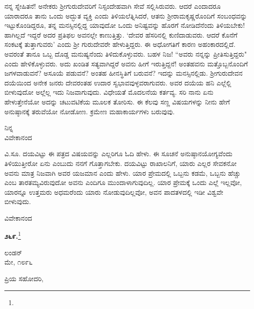 \vspace{0.2cm}

ನನ್ನ ಸ್ನೇಹಿತನೆ! ಅನೇಕರು ಶ‍್ರೀಗುರುದೇವರಿಗೆ ನಿಸ್ಸಂದೇಹವಾಗಿ ಸೇವೆ ಸಲ್ಲಿಸಿರುವರು. ಆದರೆ ಎಂದಾದರೂ ಯಾರಾದರೂ ತಾನು ಒಂದು ಅದ್ಭುತ ವ್ಯಕ್ತಿ ಎಂದು ತಿಳಿಯಲೆತ್ನಿಸಿದರೆ, ಆತನು ಶ‍್ರೀರಾಮಕೃಷ್ಣರೊಂದಿಗೆ ಸಂಬಂಧವನ್ನು ಇಟ್ಟುಕೊಂಡಿದ್ದರೂ, ತನ್ನ ಮನಸ್ಸಿನಲ್ಲಿದ್ದ ಯಾವುದೋ ಒಂದು ಅನಿಷ್ಟವನ್ನು ಹೊರಗೆ ನೋಡಿದೆನೆಂದು ತಿಳಿಯಬೇಕು! ಹಾಗಿಲ್ಲದೆ ಇದ್ದರೆ ಅದರ ಪ್ರತಿಫಲ ಅವನಲ್ಲೇ ಕಾಣುತ್ತಿತ್ತು. `ದೇವರ ಹೆಸರಿನಲ್ಲಿ ಕುಣಿದಾಡುವರು. ಆದರೆ ಕೊನೆಗೆ ಸಂಕಟಕ್ಕೆ ತುತ್ತಾಗುವರು' ಎಂದು ಶ‍್ರೀ ಗುರುದೇವರೇ ಹೇಳುತ್ತಿದ್ದರು. ಈ ಅಧೋಗತಿಗೆ ಕಾರಣ ಅಹಂಕಾರದಲ್ಲಿದೆ. ಅವರಂತೆ ತಾನೂ ಒಬ್ಬ ದೊಡ್ಡ ಮನುಷ್ಯನೆಂದು ತಿಳಿದುಕೊಳ್ಳುವರು. ಬಹಳ ನಿಜ! “ಅವರು ನನ್ನನ್ನು ಪ್ರೀತಿಸುತ್ತಿದ್ದರು" ಎಂದು ಹೇಳಿಕೊಳ್ಳುವರು. ಅದು ಖಂಡಿತ ಸತ್ಯವಾಗಿದ್ದರೆ ಅವನು ಹೀಗೆ ಇರುತ್ತಿದ್ದನೆ! ಅಂತಹವನು ಮತ್ತೊಬ್ಬನೊಂದಿಗೆ ಜಗಳವಾಡುವನೆ? ಅಸೂಯೆ ಪಡುವನೆ? ಅಂತಹ ಹೀನಸ್ಥಿತಿಗೆ ಬರುವನೆ? ಇದನ್ನು ಮನಸ್ಸಿನಲ್ಲಿಡು. ಶ‍್ರೀಗುರುದೇವನ ದಯೆಯಿಂದ ಅನೇಕ ಜನರು ದೇವರಂತಹ ಉದಾರ ಸ್ವಭಾವವುಳ್ಳವರಾಗುವರು. ಅವರ ದಯೆಯ ಹನಿ ಎಲ್ಲೆಲ್ಲಿ ಬೀಳುವುದೋ ಅಲ್ಲೆಲ್ಲ ಇದು ನಿಜವಾಗುವುದು. ವಿಧೇಯತೆ ಮೊದಲನೆಯ ಕರ್ತವ್ಯ. ಸರಿ ನಾನು ಏನು ಹೇಳುತ್ತೇನೆಯೋ ಅದನ್ನು ಚಟುವಟಿಕೆಯ ಮೂಲಕ ತೋರಿಸು. ಈ ಕೆಲವು ಸಣ್ಣ ವಿಷಯಗಳನ್ನು ನೀನು ಹೇಗೆ ಅನುಷ್ಠಾನಕ್ಕೆ ತರುವೆಯೋ ನೋಡೋಣ. ಕ್ರಮೇಣ ಮಹಾಕಾರ್ಯಗಳು ಬರುವುವು.

{\flushright
ನಿನ್ನ\\ವಿವೇಕಾನಂದ\par}

\vspace{0.3cm}

ವಿ.ಸೂ.\enginline{-} ದಯವಿಟ್ಟು ಈ ಪತ್ರದ ವಿಷಯವನ್ನು ಎಲ್ಲರಿಗೂ ಓದಿ ಹೇಳು. ಈ ಸೂಚನೆ ಅನುಷ್ಠಾನಯೋಗ್ಯವೆಂದು ತಿಳಿಯುತ್ತೀರೋ ಏನು ಎಂಬುದು ನನಗೆ ಗೊತ್ತಾಗಬೇಕು. ದಯವಿಟ್ಟು ರಾಖಾಲನಿಗೆ, ಯಾರು ಎಲ್ಲರ ಸೇವಕನೋ ಅವನು ಮಾತ್ರ ನಿಜವಾಗಿ ಅವರ ಯಜಮಾನ ಎಂದು ಹೇಳು. ಯಾರ ಪ್ರೇಮದಲ್ಲಿ ಒಬ್ಬನು ಕಡಮೆ, ಒಬ್ಬನು ಹೆಚ್ಚು ಎಂಬ ತಾರತಮ್ಯವಿರುವುದೋ ಅವನು ಎಂದಿಗೂ ಮುಂದಾಳಾಗುವುದಿಲ್ಲ. ಯಾರ ಪ್ರೇಮಕ್ಕೆ ಒಂದು ಎಲ್ಲೆ ಇಲ್ಲವೋ, ಯಾರನ್ನೂ ಉತ್ತಮರು ಅಧಮರೆಂದು ಯಾರು ನೋಡುವುದಿಲ್ಲವೋ, ಅವನ ಪಾದತಳದಲ್ಲಿ ಇಡೀ ವಿಶ್ವವೇ ಬೀಳುವುದು.

\vspace{0.2cm}

{\flushright
ವಿವೇಕಾನಂದ\par}

\begin{center}
\textbf{೨೬೯.}\footnote{}
\end{center}

\begin{flushright}
ಲಂಡನ್\\ಮೇ, ೧೮೯೬
\end{flushright}

\noindent
ಪ್ರಿಯ ಸಹೋದರಿ,

\vspace{0.2cm}

